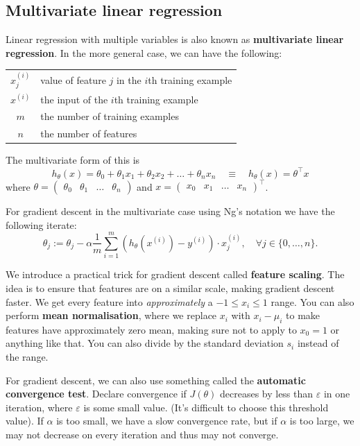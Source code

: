 \documentclass[a4paper, 12pt, oneside]{scrartcl}
\begin{document}
\subsection{Multivariate linear regression}

Linear regression with multiple variables is also known as \textbf{multivariate linear regression}. In the more general case, we can have the following:

\begin{center}
    \begin{tabular}{cl}
     $x_j^{(i)}$ & value of feature $j$ in the $i$th training example \\
     $x^{(i)}$ & the input of the $i$th training example \\
     $m$ & the number of training examples \\
     $n$ & the number of features
    \end{tabular}
\end{center}
The multivariate form of this is
\[h_\theta(x) = \theta_0 + \theta_1 x_1 + \theta_2 x_2 + \ldots + \theta_n x_n \quad \equiv \quad h_\theta(x) = \theta^\top x\]
where $\theta = \begin{pmatrix} \theta_0 & \theta_1 & \ldots & \theta_n \end{pmatrix}$ and $x = \begin{pmatrix} x_0 & x_1 & \ldots & x_n \end{pmatrix}^\top$.

For gradient descent in the multivariate case using Ng's notation we have the following iterate:
\[\theta_j := \theta_j - \alpha \frac1m \sum_{i=1}^m (h_\theta(x^{(i)}) - y^{(i)}) \cdot x_j^{(i)}, \quad \forall j \in \{0, \ldots, n\}.\]

We introduce a practical trick for gradient descent called \textbf{feature scaling}. The idea is to ensure that features are on a similar scale, making gradient descent faster. We get every feature into \textit{approximately} a $-1 \leq x_i \leq 1$ range. You can also perform \textbf{mean normalisation}, where we replace $x_i$ with $x_i - \mu_i$ to make features have approximately zero mean, making sure not to apply to $x_0 = 1$ or anything like that. You can also divide by the standard deviation $s_i$ instead of the range.

For gradient descent, we can also use something called the \textbf{automatic convergence test}. Declare convergence if $J(\theta)$ decreases by less than $\varepsilon$ in one iteration, where $\varepsilon$ is some small value. (It's difficult to choose this threshold value). If $\alpha$ is too small, we have a slow convergence rate, but if $\alpha$ is too large, we may not decrease on every iteration and thus may not converge.
\end{document}
